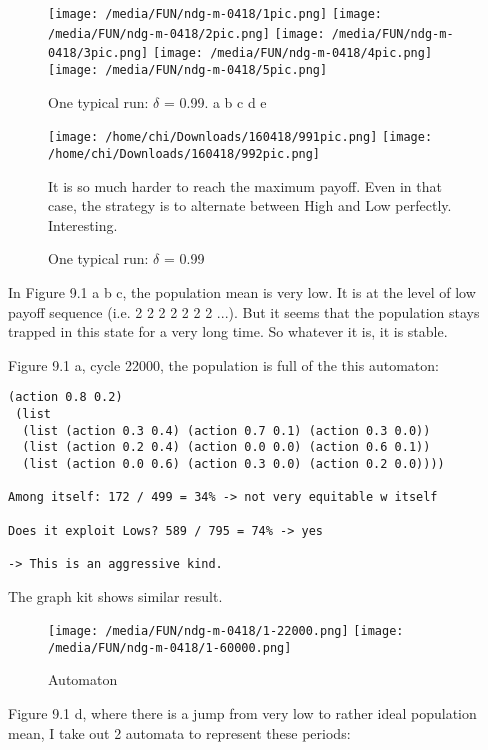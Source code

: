 \documentclass[12.5pt]{report}
\begin{document}
\begin{figure}
\texttt{[image: /media/FUN/ndg-m-0418/1pic.png]}
\texttt{[image: /media/FUN/ndg-m-0418/2pic.png]}
\texttt{[image: /media/FUN/ndg-m-0418/3pic.png]}
\texttt{[image: /media/FUN/ndg-m-0418/4pic.png]}
\texttt{[image: /media/FUN/ndg-m-0418/5pic.png]}

\caption{One typical run: $\delta$ = 0.99. a b c d e}
\end{figure}


\begin{figure}
\texttt{[image: /home/chi/Downloads/160418/991pic.png]}
\texttt{[image: /home/chi/Downloads/160418/992pic.png]}

It is so much harder to reach the maximum payoff. Even in that case, the strategy is to alternate between High and Low perfectly. Interesting.


\caption{One typical run: $\delta$ = 0.99}
\end{figure}


In Figure 9.1 a b c, the population mean is very low. It is at the level of low payoff sequence (i.e. 2 2 2 2 2 2 2 ...). But it seems that the population stays trapped in this state for a very long time. So whatever it is, it is stable.

Figure 9.1 a, cycle 22000, the population is full of the this automaton:

\begin{verbatim}
(action 0.8 0.2)
 (list
  (list (action 0.3 0.4) (action 0.7 0.1) (action 0.3 0.0))
  (list (action 0.2 0.4) (action 0.0 0.0) (action 0.6 0.1))
  (list (action 0.0 0.6) (action 0.3 0.0) (action 0.2 0.0))))
  
Among itself: 172 / 499 = 34% -> not very equitable w itself

Does it exploit Lows? 589 / 795 = 74% -> yes

-> This is an aggressive kind.
\end{verbatim}

The graph kit shows similar result.

\begin{figure}
\center
\texttt{[image: /media/FUN/ndg-m-0418/1-22000.png]}
\texttt{[image: /media/FUN/ndg-m-0418/1-60000.png]}
\caption{Automaton}
\end{figure}

Figure 9.1 d, where there is a jump from very low to rather ideal population mean, I take out 2 automata to represent these periods:
\end{document}
